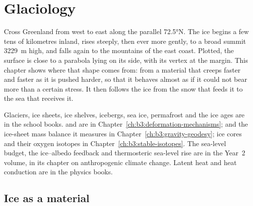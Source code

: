 \chapter{Glaciology}\label{ch:b3:glaciology}

Cross Greenland from west to east along the parallel \ang{72.5}N. The ice
begins a few tens of kilometres inland, rises steeply, then ever more gently,
to a broad summit \qty{3229}{m} high, and falls again to the mountains of the
east coast. Plotted, the surface is close to a parabola lying on its side,
with its vertex at the margin. This chapter shows where that shape comes
from: from a material that creeps faster and faster as it is pushed harder,
so that it behaves almost as if it could not bear more than a certain stress.
It then follows the ice from the snow that feeds it to the sea that receives
it.

\begin{recall}
Glaciers, ice sheets, ice shelves, icebergs, sea ice, permafrost and the ice
ages are in the school books.  and  are in
Chapter~\ref{ch:b3:deformation-mechanisms};  and the
ice-sheet mass balance it measures in Chapter~\ref{ch:b3:gravity-geodesy};
ice cores and their oxygen isotopes in Chapter~\ref{ch:b3:stable-isotopes}.
The sea-level budget, the ice--albedo feedback and thermosteric sea-level
rise are in the Year~2 volume, in its chapter on anthropogenic climate
change. Latent heat and heat conduction are in the physics books.
\end{recall}

\section{Ice as a material}\label{sec:b3:glaciology:material}

